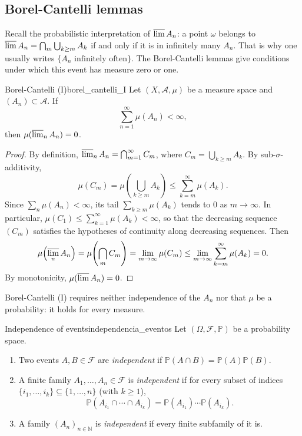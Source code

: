 \documentclass[11pt, a4paper]{article}
\begin{document}
\subsection{Borel-Cantelli lemmas}

Recall the probabilistic interpretation of $\varlimsup A_n$: a point $\omega$ belongs
to $\varlimsup A_n = \bigcap_m \bigcup_{k \ge m} A_k$ if and only if it is in infinitely many $A_n$. That
is why one usually writes $\{A_n \text{ infinitely often}\}$. The Borel-Cantelli lemmas give
conditions under which this event has measure zero or one.

\begin{teorema}{Borel-Cantelli (I)}{borel_cantelli_I}
Let $(X, \mathcal{A}, \mu)$ be a measure space and $(A_n) \subset \mathcal{A}$. If
$$ \sum_{n=1}^\infty \mu(A_n) < \infty, $$
then $\mu(\varlimsup_n A_n) = 0$.
\end{teorema}

\begin{proof}
By definition, $\varlimsup_n A_n = \bigcap_{m=1}^\infty C_m$, where $C_m = \bigcup_{k \ge m}
A_k$. By sub-$\sigma$-additivity,
$$ \mu(C_m) = \mu\!\left(\bigcup_{k \ge m} A_k\right) \le \sum_{k=m}^\infty \mu(A_k). $$
Since $\sum_n \mu(A_n) < \infty$, its tail $\sum_{k \ge m} \mu(A_k)$ tends to $0$ as $m \to
\infty$. In particular, $\mu(C_1) \le \sum_{k=1}^\infty \mu(A_k) < \infty$, so that the
decreasing sequence $(C_m)$ satisfies the hypotheses of continuity along decreasing
sequences. Then
$$ \mu\!\left(\varlimsup_n A_n\right) = \mu\!\left(\bigcap_m C_m\right) = \lim_{m \to \infty}
\mu(C_m) \le \lim_{m \to \infty} \sum_{k=m}^\infty \mu(A_k) = 0. $$
By monotonicity, $\mu(\varlimsup A_n) = 0$.
\end{proof}

\obs Borel-Cantelli (I) requires neither independence of the $A_n$ nor that $\mu$ be a probability:
it holds for every measure.

\begin{definicion}{Independence of events}{independencia_eventos}
Let $(\Omega, \mathcal{F}, \mathbb{P})$ be a probability space.
\begin{enumerate}
    \item Two events $A, B \in \mathcal{F}$ are \emph{independent} if
    $\mathbb{P}(A \cap B) = \mathbb{P}(A) \mathbb{P}(B)$.
    \item A finite family $A_1, \dots, A_n \in \mathcal{F}$ is \emph{independent} if for every
    subset of indices $\{i_1, \dots, i_k\} \subseteq \{1, \dots, n\}$ (with $k \ge 1$),
    $$ \mathbb{P}(A_{i_1} \cap \cdots \cap A_{i_k}) = \mathbb{P}(A_{i_1}) \cdots
    \mathbb{P}(A_{i_k}). $$
    \item A family $(A_n)_{n \in \mathbb{N}}$ is \emph{independent} if every finite subfamily
    of it is.
\end{enumerate}
\end{definicion}
\end{document}
